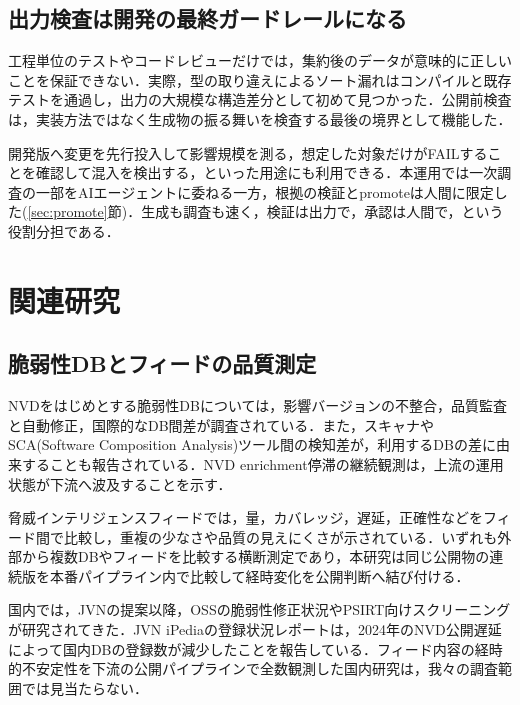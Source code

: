 \documentclass{css}
\begin{document}
\subsection{出力検査は開発の最終ガードレールになる}
\label{sec:guardrail}

工程単位のテストやコードレビューだけでは，集約後のデータが意味的に正しいことを保証できない．実際，型の取り違えによるソート漏れはコンパイルと既存テストを通過し，出力の大規模な構造差分として初めて見つかった．公開前検査は，実装方法ではなく生成物の振る舞いを検査する最後の境界として機能した．

開発版へ変更を先行投入して影響規模を測る，想定した対象だけがFAILすることを確認して混入を検出する，といった用途にも利用できる．本運用では一次調査の一部をAIエージェントに委ねる一方，根拠の検証とpromoteは人間に限定した(\ref{sec:promote}節)．生成も調査も速く，検証は出力で，承認は人間で，という役割分担である．

\section{関連研究}
\label{sec:related}

\subsection{脆弱性DBとフィードの品質測定}

NVDをはじめとする脆弱性DBについては，影響バージョンの不整合\cite{dong19}，品質監査と自動修正\cite{anwar22}，国際的なDB間差\cite{lin26}が調査されている．また，スキャナやSCA(Software Composition Analysis)ツール間の検知差が，利用するDBの差に由来することも報告されている\cite{imtiaz21,churakova25}．NVD enrichment停滞の継続観測\cite{vulncheck24,anchore25}は，上流の運用状態が下流へ波及することを示す．

脅威インテリジェンスフィードでは，量，カバレッジ，遅延，正確性などをフィード間で比較し，重複の少なさや品質の見えにくさが示されている\cite{li19,bouwman20,griffioen20}．いずれも外部から複数DBやフィードを比較する横断測定であり，本研究は同じ公開物の連続版を本番パイプライン内で比較して経時変化を公開判断へ結び付ける．

国内では，JVNの提案\cite{terada05}以降，OSSの脆弱性修正状況\cite{kuzuno24}やPSIRT向けスクリーニング\cite{kanai24}が研究されてきた．JVN iPediaの登録状況レポート\cite{ipa-jvnipedia}は，2024年のNVD公開遅延によって国内DBの登録数が減少したことを報告している．フィード内容の経時的不安定性を下流の公開パイプラインで全数観測した国内研究は，我々の調査範囲では見当たらない．
\end{document}
